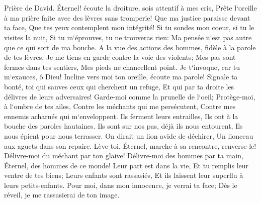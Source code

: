 \chapter{}

\verse Prière de David. Éternel! écoute la droiture, sois attentif à mes cris, Prête l`oreille à ma prière faite avec des lèvres sans tromperie! 
\verse Que ma justice paraisse devant ta face, Que tes yeux contemplent mon intégrité! 
\verse Si tu sondes mon coeur, si tu le visites la nuit, Si tu m`éprouves, tu ne trouveras rien: Ma pensée n`est pas autre que ce qui sort de ma bouche. 
\verse A la vue des actions des hommes, fidèle à la parole de tes lèvres, Je me tiens en garde contre la voie des violents; 
\verse Mes pas sont fermes dans tes sentiers, Mes pieds ne chancellent point. 
\verse Je t`invoque, car tu m`exauces, ô Dieu! Incline vers moi ton oreille, écoute ma parole! 
\verse Signale ta bonté, toi qui sauves ceux qui cherchent un refuge, Et qui par ta droite les délivres de leurs adversaires! 
\verse Garde-moi comme la prunelle de l`oeil; Protège-moi, à l`ombre de tes ailes, 
\verse Contre les méchants qui me persécutent, Contre mes ennemis acharnés qui m`enveloppent. 
\verse Ils ferment leurs entrailles, Ils ont à la bouche des paroles hautaines. 
\verse Ils sont sur nos pas, déjà ils nous entourent, Ils nous épient pour nous terrasser. 
\verse On dirait un lion avide de déchirer, Un lionceau aux aguets dans son repaire. 
\verse Lève-toi, Éternel, marche à sa rencontre, renverse-le! Délivre-moi du méchant par ton glaive! 
\verse Délivre-moi des hommes par ta main, Éternel, des hommes de ce monde! Leur part est dans la vie, Et tu remplis leur ventre de tes biens; Leurs enfants sont rassasiés, Et ils laissent leur superflu à leurs petits-enfants. 
\verse Pour moi, dans mon innocence, je verrai ta face; Dès le réveil, je me rassasierai de ton image. 

\chapter{}

